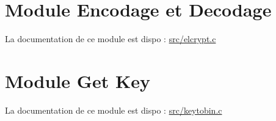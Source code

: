 \hypertarget{index_Elcript}{}\section{Module Encodage et Decodage}\label{index_Elcript}
La documentation de ce module est dispo \-: \hyperlink{elcrypt_8c_source}{src/elcrypt.\-c}\hypertarget{index_key}{}\section{Module Get Key}\label{index_key}
La documentation de ce module est dispo \-: \hyperlink{keytobin_8c_source}{src/keytobin.\-c} 